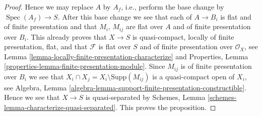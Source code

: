 \documentclass[10pt,a4paper]{amsart}
\theoremstyle{plain}
\theoremstyle{definition}
\theoremstyle{remark}
\numberwithin{equation}{subsection}
\def\Spec{\mathop{\mathrm{Spec}}}
\begin{document}
\begin{proof}
\medskip\noindent
Hence we may replace $A$ by $A_f$, i.e.,
perform the base change by $\Spec(A_f) \to S$.
After this base change we see that each of $A \to B_i$ is
flat and of finite presentation and that $M_i$, $M_{ij}$ are flat over $A$
and of finite presentation over $B_i$.
This already proves that $X \to S$ is quasi-compact,
locally of finite presentation, flat, and that $\mathcal{F}$
is flat over $S$ and of finite presentation over $\mathcal{O}_X$, see
Lemma \ref{lemma-locally-finite-presentation-characterize}
and
Properties, Lemma \ref{properties-lemma-finite-presentation-module}.
Since $M_{ij}$ is of finite presentation over $B_i$ we see that
$X_i \cap X_j = X_i \setminus \text{Supp}(M_{ij})$ is a quasi-compact
open of $X_i$, see
Algebra, Lemma \ref{algebra-lemma-support-finite-presentation-constructible}.
Hence we see that $X \to S$ is quasi-separated by
Schemes, Lemma \ref{schemes-lemma-characterize-quasi-separated}.
This proves the proposition.
\end{proof}
\end{document}
